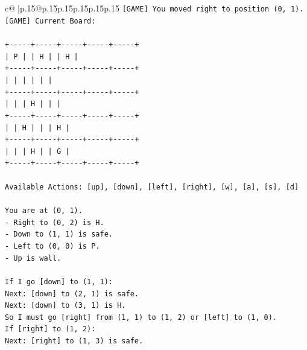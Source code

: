 \documentclass{article}
\begin{document}
{\begin{supertabular}{c@{$\;$}|p{.15\linewidth}@{}p{.15\linewidth}p{.15\linewidth}p{.15\linewidth}p{.15\linewidth}p{.15\linewidth}}
{{{\texttt{{[}GAME{]} You moved right to position (0, 1).} \\
\texttt{{[}GAME{]} Current Board:} \\
\\ 
\texttt{+{-}{-}{-}{-}{-}+{-}{-}{-}{-}{-}+{-}{-}{-}{-}{-}+{-}{-}{-}{-}{-}+{-}{-}{-}{-}{-}+} \\
\texttt{|  P  |     |  H  |     |  H  |} \\
\texttt{+{-}{-}{-}{-}{-}+{-}{-}{-}{-}{-}+{-}{-}{-}{-}{-}+{-}{-}{-}{-}{-}+{-}{-}{-}{-}{-}+} \\
\texttt{|     |     |     |     |     |} \\
\texttt{+{-}{-}{-}{-}{-}+{-}{-}{-}{-}{-}+{-}{-}{-}{-}{-}+{-}{-}{-}{-}{-}+{-}{-}{-}{-}{-}+} \\
\texttt{|     |     |  H  |     |     |} \\
\texttt{+{-}{-}{-}{-}{-}+{-}{-}{-}{-}{-}+{-}{-}{-}{-}{-}+{-}{-}{-}{-}{-}+{-}{-}{-}{-}{-}+} \\
\texttt{|     |  H  |     |     |  H  |} \\
\texttt{+{-}{-}{-}{-}{-}+{-}{-}{-}{-}{-}+{-}{-}{-}{-}{-}+{-}{-}{-}{-}{-}+{-}{-}{-}{-}{-}+} \\
\texttt{|     |     |  H  |     |  G  |} \\
\texttt{+{-}{-}{-}{-}{-}+{-}{-}{-}{-}{-}+{-}{-}{-}{-}{-}+{-}{-}{-}{-}{-}+{-}{-}{-}{-}{-}+} \\
\\ 
\texttt{Available Actions: {[}up{]}, {[}down{]}, {[}left{]}, {[}right{]}, {[}w{]}, {[}a{]}, {[}s{]}, {[}d{]}} \\
\\ 
\texttt{You are at (0, 1).} \\
\texttt{{-} Right to (0, 2) is H.} \\
\texttt{{-} Down to (1, 1) is safe.} \\
\texttt{{-} Left to (0, 0) is P.} \\
\texttt{{-} Up is wall.} \\
\\ 
\texttt{If I go {[}down{]} to (1, 1):} \\
\texttt{Next: {[}down{]} to (2, 1) is safe.} \\
\texttt{Next: {[}down{]} to (3, 1) is H.} \\
\texttt{So I must go {[}right{]} from (1, 1) to (1, 2) or {[}left{]} to (1, 0).} \\
\texttt{If {[}right{]} to (1, 2):} \\
\texttt{Next: {[}right{]} to (1, 3) is safe.} \\
}}}
\end{supertabular}}
\end{document}
